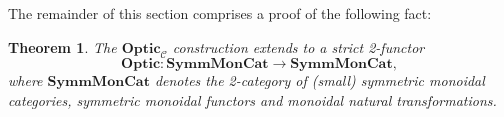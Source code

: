 \documentclass[11pt,letterpaper]{article}
\theoremstyle{plain}
\newtheorem{theorem}{Theorem}[subsection]
\theoremstyle{definition}
\newcommand{\C}{\mathscr{C}}
\newcommand{\SymmMonCat}{\mathbf{SymmMonCat}}
\newcommand{\Optic}{\mathbf{Optic}}
\newcommand{\todo}[1]{\textcolor{red}{\small #1}}
\begin{document}
The remainder of this section comprises a proof of the following fact:

\begin{theorem}\label{thm:optic-functor}
  The $\Optic_\C$ construction extends to a strict 2-functor \[\Optic : \SymmMonCat \to \SymmMonCat,\] where $\SymmMonCat$ denotes the 2-category of (small) symmetric monoidal categories, symmetric monoidal functors and monoidal natural transformations.
\end{theorem}


\end{document}
